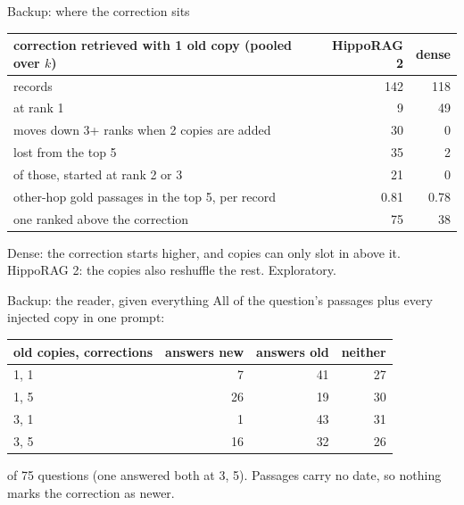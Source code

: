 \documentclass[aspectratio=169,12pt]{beamer}
\newcommand{\quiet}[1]{{\color{muted}\small #1}}
\begin{document}
\begin{frame}{Backup: where the correction sits}
\small
\begin{tabular}{@{}lrr@{}}
\toprule
correction retrieved with 1 old copy (pooled over $k$) & HippoRAG 2 & dense\\
\midrule
records & 142 & 118\\
at rank 1 & 9 & 49\\
moves down 3+ ranks when 2 copies are added & 30 & 0\\
lost from the top 5 & 35 & 2\\
\quad of those, started at rank 2 or 3 & 21 & 0\\
other-hop gold passages in the top 5, per record & 0.81 & 0.78\\
\quad one ranked above the correction & 75 & 38\\
\bottomrule
\end{tabular}

\vspace{0.7em}
\normalsize
Dense: the correction starts higher, and copies can only slot in above it.\\
HippoRAG 2: the copies also reshuffle the rest. \quiet{Exploratory.}
\end{frame}

\begin{frame}{Backup: the reader, given everything}
All of the question's passages plus every injected copy in one prompt:

\vspace{0.6em}
\begin{tabular}{@{}lrrr@{}}
\toprule
old copies, corrections & answers new & answers old & neither\\
\midrule
1, 1 & 7 & 41 & 27\\
1, 5 & 26 & 19 & 30\\
3, 1 & 1 & 43 & 31\\
3, 5 & 16 & 32 & 26\\
\bottomrule
\end{tabular}

\vspace{0.6em}
\quiet{of 75 questions (one answered both at 3, 5). Passages carry no date, so nothing marks the correction as newer.}
\end{frame}
\end{document}

